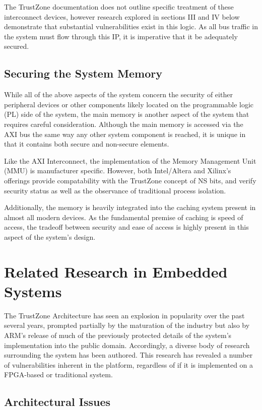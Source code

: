 \documentclass[journal]{IEEEtran}
\begin{document}
The TrustZone documentation does not outline specific treatment of these interconnect
devices, however research explored in sections III and IV below demonstrate that
substantial vulnerabilities exist in this logic. As all bus traffic in the system must
flow through this IP, it is imperative that it be adequately secured.

\subsection{Securing the System Memory}
While all of the above aspects of the system concern the security of either peripheral
devices or other components likely located on the programmable logic (PL) side of the 
system, the main memory is another aspect of the system that requires careful 
consideration. Although the main memory is accessed via the AXI bus the same way any other
system component is reached, it is unique in that it contains both secure and non-secure
elements.

Like the AXI Interconnect, the implementation of the Memory Management Unit (MMU) is
manufacturer specific. However, both Intel/Altera and Xilinx's offerings provide
compatability with the TrustZone concept of NS bits, and verify security status as well as
the observance of traditional process isolation. \cite{gross_breaking_2019}

Additionally, the memory is heavily integrated into the caching system present in almost
all modern devices. As the fundamental premise of caching is speed of access, the tradeoff
between security and ease of access is highly present in this aspect of the system's
design. 

\section{Related Research in Embedded Systems}
The TrustZone Architecture has seen an explosion in popularity over the past several
years, prompted partially by the maturation of the industry but also by ARM's release of 
much of the previously protected details of the system's implementation into the public
domain. Accordingly, a diverse body of research surrounding the system has been authored.
This research has revealed a number of vulnerabilities inherent in the platform,
regardless of if it is implemented on a FPGA-based or traditional system.

\subsection{Architectural Issues}
\end{document}
